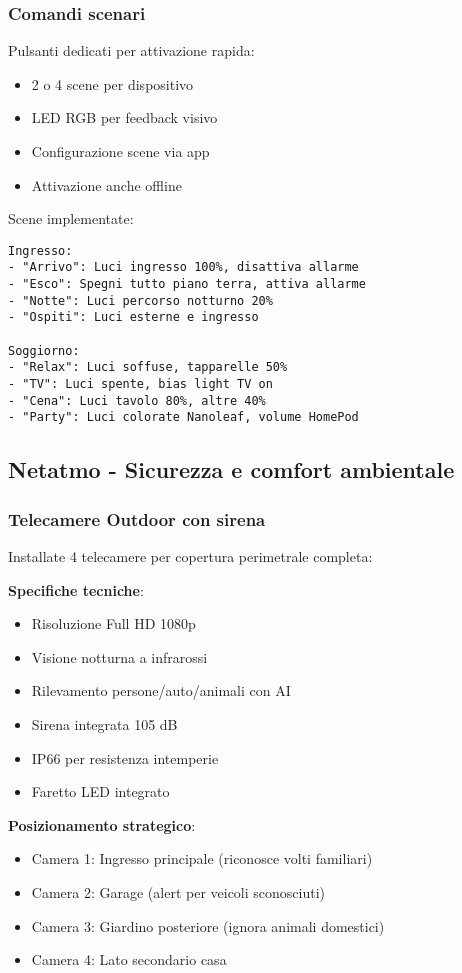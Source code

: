 \subsubsection{Comandi scenari}

Pulsanti dedicati per attivazione rapida:
\begin{itemize}
    \item 2 o 4 scene per dispositivo
    \item LED RGB per feedback visivo
    \item Configurazione scene via app
    \item Attivazione anche offline
\end{itemize}

Scene implementate:
\begin{verbatim}
Ingresso:
- "Arrivo": Luci ingresso 100%, disattiva allarme
- "Esco": Spegni tutto piano terra, attiva allarme
- "Notte": Luci percorso notturno 20%
- "Ospiti": Luci esterne e ingresso

Soggiorno:
- "Relax": Luci soffuse, tapparelle 50%
- "TV": Luci spente, bias light TV on
- "Cena": Luci tavolo 80%, altre 40%
- "Party": Luci colorate Nanoleaf, volume HomePod
\end{verbatim}

\subsection{Netatmo - Sicurezza e comfort ambientale}

\subsubsection{Telecamere Outdoor con sirena}

Installate 4 telecamere per copertura perimetrale completa:

\textbf{Specifiche tecniche}:
\begin{itemize}
    \item Risoluzione Full HD 1080p
    \item Visione notturna a infrarossi
    \item Rilevamento persone/auto/animali con AI
    \item Sirena integrata 105 dB
    \item IP66 per resistenza intemperie
    \item Faretto LED integrato
\end{itemize}

\textbf{Posizionamento strategico}:
\begin{itemize}
    \item Camera 1: Ingresso principale (riconosce volti familiari)
    \item Camera 2: Garage (alert per veicoli sconosciuti)
    \item Camera 3: Giardino posteriore (ignora animali domestici)
    \item Camera 4: Lato secondario casa
\end{itemize}

